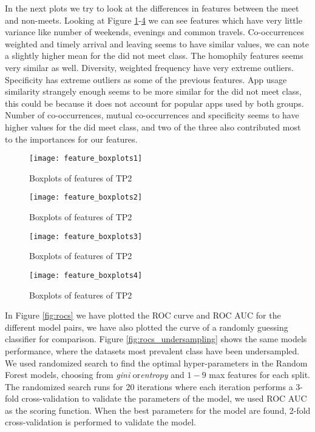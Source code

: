 In the next plots we try to look at the differences in features between the meet and non-meets.
Looking at Figure \ref{fig:feature_boxplots1}-\ref{fig:feature_boxplots4} we can see features which have very little variance like number of weekends, evenings and common travels. Co-occurrences weighted and timely arrival and leaving seems to have similar values, we can note a slightly higher mean for the did not meet class. The homophily features seems very similar as well. Diversity, weighted frequency have very extreme outliers. Specificity has extreme outliers as some of the previous features. App usage similarity strangely enough seems to be more similar for the did not meet class, this could be because it does not account for popular apps used by both groups. Number of co-occurrences, mutual co-occurrences and specificity seems to have higher values for the did meet class, and two of the three also contributed most to the importances for our features.

\begin{figure}[H]
    \hspace*{-1.0cm}
    \centering
    \texttt{[image: feature\_boxplots1]}
    \caption{Boxplots of features of TP2}
    \label{fig:feature_boxplots1}
\end{figure}

\begin{figure}[H]
    \hspace*{-1.0cm}
    \centering
    \texttt{[image: feature\_boxplots2]}
    \caption{Boxplots of features of TP2}
    \label{fig:feature_boxplots2}
\end{figure}
\begin{figure}[H]
    \hspace*{-1.0cm}
    \centering
    \texttt{[image: feature\_boxplots3]}
    \caption{Boxplots of features of TP2}
    \label{fig:feature_boxplots3}
\end{figure}
\begin{figure}[H]
    \hspace*{-1.0cm}
    \centering
    \texttt{[image: feature\_boxplots4]}
    \caption{Boxplots of features of TP2}
    \label{fig:feature_boxplots4}
\end{figure}
In Figure \ref{fig:rocs} we have plotted the ROC curve and ROC AUC for the different model pairs, we have also plotted the curve of a randomly guessing classifier for comparison. Figure \ref{fig:rocs_undersampling} shows the same models performance, where the datasets most prevalent class have been undersampled. We used randomized search to find the optimal hyper-parameters in the Random Forest models, choosing from \textit{gini} or\textit{entropy} and $1-9$ max features for each split. The randomized search runs for 20 iterations where each iteration performs a 3-fold cross-validation to validate the parameters of the model, we used ROC AUC as the scoring function. When the best parameters for the model are found, 2-fold cross-validation is performed to validate the model.

